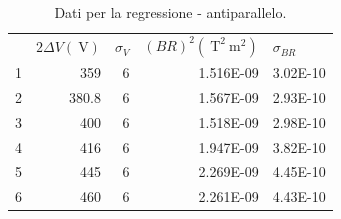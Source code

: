 \documentclass[a4paper,11pt]{article}
\begin{document}
		\begin{table}[htpb]
			\centering
			\caption{Dati per la regressione - antiparallelo.}
			\label{retta_parall}
			\begin{tabular}{rrrrr}
				\rowcolor[HTML]{BBDAFF} 
				\multicolumn{1}{l}{\cellcolor[HTML]{BBDAFF}} & $2\Delta V (\SI{}{\volt})$ & \multicolumn{1}{l}{\cellcolor[HTML]{BBDAFF}$\sigma_V$} & \multicolumn{1}{l}{\cellcolor[HTML]{BBDAFF}$(B R)^2 (\SI{}{\tesla}^2\SI{}{\meter}^2)$} & \multicolumn{1}{l}{\cellcolor[HTML]{BBDAFF}$\sigma_{BR}$} \\
				\rowcolor[HTML]{C0C0C0} 
				\cellcolor[HTML]{BBDAFF}1                    & 359                        & 6                                                      & 1.516E-09                                                                              & 3.02E-10                                                  \\
				\rowcolor[HTML]{EFEFEF} 
				\cellcolor[HTML]{BBDAFF}2                    & 380.8                      & 6                                                      & 1.567E-09                                                                              & 2.93E-10                                                  \\
				\rowcolor[HTML]{C0C0C0} 
				\cellcolor[HTML]{BBDAFF}3                    & 400                        & 6                                                      & 1.518E-09                                                                              & 2.98E-10                                                  \\
				\rowcolor[HTML]{EFEFEF} 
				\cellcolor[HTML]{BBDAFF}4                    & 416                        & 6                                                      & 1.947E-09                                                                              & 3.82E-10                                                  \\
				\rowcolor[HTML]{C0C0C0} 
				\cellcolor[HTML]{BBDAFF}5                    & 445                        & 6                                                      & 2.269E-09                                                                              & 4.45E-10                                                  \\
				\rowcolor[HTML]{EFEFEF} 
				\cellcolor[HTML]{BBDAFF}6                    & 460                        & 6                                                      & 2.261E-09                                                                              & 4.43E-10                                                  \\

\end{tabular}
\end{table}
\end{document}
